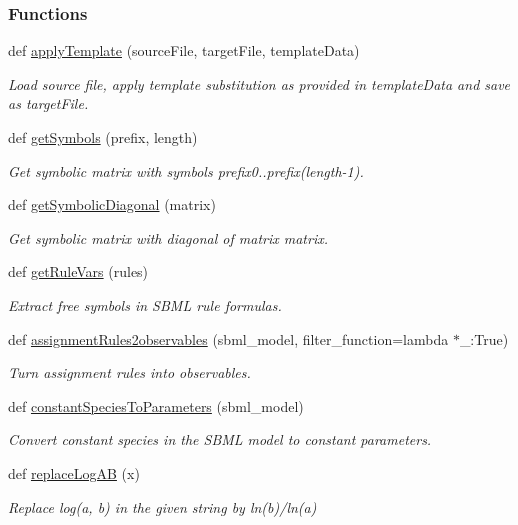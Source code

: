 \subsubsection*{Functions}
\begin{DoxyCompactItemize}
\item 
def \mbox{\hyperlink{namespaceamici_1_1sbml__import_a48216d1729cee722a7aa363d9ecc63c4}{apply\+Template}} (source\+File, target\+File, template\+Data)
\begin{DoxyCompactList}\small\item\em Load source file, apply template substitution as provided in template\+Data and save as target\+File. \end{DoxyCompactList}\item 
def \mbox{\hyperlink{namespaceamici_1_1sbml__import_a986c53b165e78ab8ba560976b4506294}{get\+Symbols}} (prefix, length)
\begin{DoxyCompactList}\small\item\em Get symbolic matrix with symbols prefix0..prefix(length-\/1). \end{DoxyCompactList}\item 
def \mbox{\hyperlink{namespaceamici_1_1sbml__import_a1d4d368d095429428738451ae90d911f}{get\+Symbolic\+Diagonal}} (matrix)
\begin{DoxyCompactList}\small\item\em Get symbolic matrix with diagonal of matrix {\ttfamily matrix}. \end{DoxyCompactList}\item 
def \mbox{\hyperlink{namespaceamici_1_1sbml__import_a64a5d0187cb4b3f69bceceb7d5638691}{get\+Rule\+Vars}} (rules)
\begin{DoxyCompactList}\small\item\em Extract free symbols in S\+B\+ML rule formulas. \end{DoxyCompactList}\item 
def \mbox{\hyperlink{namespaceamici_1_1sbml__import_aaba72ac8b7d363e7720f36495ccc3285}{assignment\+Rules2observables}} (sbml\+\_\+model, filter\+\_\+function=lambda $\ast$\+\_\+\+:\+True)
\begin{DoxyCompactList}\small\item\em Turn assignment rules into observables. \end{DoxyCompactList}\item 
def \mbox{\hyperlink{namespaceamici_1_1sbml__import_a9cee719122a45a0ac8590514a19ed5cc}{constant\+Species\+To\+Parameters}} (sbml\+\_\+model)
\begin{DoxyCompactList}\small\item\em Convert constant species in the S\+B\+ML model to constant parameters. \end{DoxyCompactList}\item 
def \mbox{\hyperlink{namespaceamici_1_1sbml__import_a178c633ce1bc7f2af378ce56bd404541}{replace\+Log\+AB}} (x)
\begin{DoxyCompactList}\small\item\em Replace log(a, b) in the given string by ln(b)/ln(a) \end{DoxyCompactList}\end{DoxyCompactItemize}


